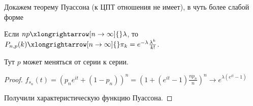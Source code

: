Докажем теорему Пуассона (к ЦПТ отношения не имеет), в чуть более слабой форме
\begin{theorem}
Если $np \xlongrightarrow[n \to \infty]{} \lambda$, то $P_{n,p}(k) \xlongrightarrow[n \to \infty]{} \pi_k = e^{-\lambda}\frac{\lambda^k}{k!}$.

Тут $p$ может меняться от серии к серии.
\end{theorem}
\begin{proof}
    $f_{s_n}(t) = (p_n e^{it} + (1 - p_n))^n = (1 + (e^{it} - 1)\frac{np_n}{n})^n \to e^{\lambda(e^{it} - 1)}$

    Получили характеристическую функцию Пуассона.
\end{proof}                             